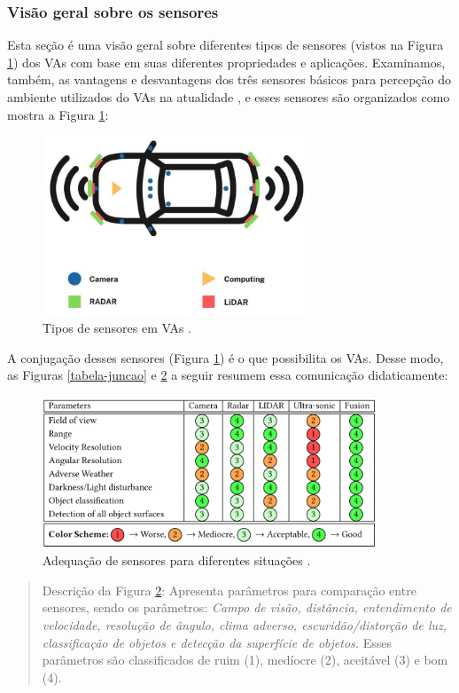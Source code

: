  

\subsubsection{Visão geral sobre os sensores} \label{sensores}

Esta seção é uma visão geral sobre diferentes tipos de sensores (vistos na Figura \ref{figura-sensores}) dos VAs com base em suas diferentes propriedades e aplicações. Examinamos, também, as vantagens e desvantagens dos três sensores básicos para percepção do ambiente utilizados do VAs na atualidade \cite{sensors}, e esses sensores são organizados como mostra a Figura \ref{figura-sensores}:


\begin{figure}[H]
\centering
\includegraphics[width=8cm]{Figures/sensores.png}
\caption{Tipos de sensores em VAs \cite{review-auto}.}
\label{figura-sensores}
\end{figure}


A conjugação desses sensores (Figura \ref{figura-sensores}) é o que possibilita os VAs. Desse modo, as Figuras \ref{tabela-juncao} e \ref{all-sense} a seguir resumem essa comunicação didaticamente:

\begin{figure}[H]
\centering
\includegraphics[width=10cm]{Figures/all-sense.png}
\caption{Adequação de sensores para diferentes situações \cite{sensors-yet}.}
\label{all-sense}
\end{figure}
\begin{quote}
Descrição da Figura \ref{all-sense}: Apresenta parâmetros para comparação entre sensores, sendo os parâmetros: \textit{Campo de visão, distância, entendimento de velocidade, resolução de ângulo, clima adverso, escuridão/distorção de luz, classificação de objetos e detecção da superfície de objetos.} Esses parâmetros são classificados de ruim (1), medíocre (2), 
aceitável (3) e bom (4).
\end{quote}

